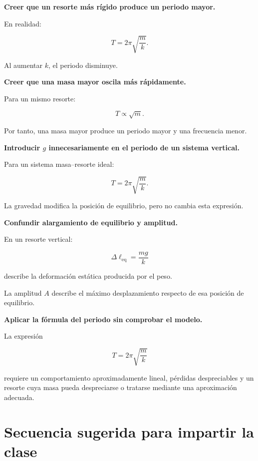 \begin{errorfrecuente}
\textbf{Creer que un resorte más rígido produce un periodo mayor.}

En realidad:

\[ T=2\pi\sqrt{\frac{m}{k}}. \]

Al aumentar \(k\), el periodo disminuye.
\end{errorfrecuente}

\begin{errorfrecuente}
\textbf{Creer que una masa mayor oscila más rápidamente.}

Para un mismo resorte:

\[ T\propto\sqrt{m}. \]

Por tanto, una masa mayor produce un periodo mayor y una frecuencia menor.
\end{errorfrecuente}

\begin{errorfrecuente}
\textbf{Introducir \(g\) innecesariamente en el periodo de un sistema vertical.}

Para un sistema masa--resorte ideal:

\[ T=2\pi\sqrt{\frac{m}{k}}. \]

La gravedad modifica la posición de equilibrio, pero no cambia esta expresión.
\end{errorfrecuente}

\begin{errorfrecuente}
\textbf{Confundir alargamiento de equilibrio y amplitud.}

En un resorte vertical:

\[ \Delta\ell_{\mathrm{eq}}=\frac{mg}{k} \]

describe la deformación estática producida por el peso.

La amplitud \(A\) describe el máximo desplazamiento respecto de esa posición de equilibrio.
\end{errorfrecuente}

\begin{errorfrecuente}
\textbf{Aplicar la fórmula del periodo sin comprobar el modelo.}

La expresión

\[ T=2\pi\sqrt{\frac{m}{k}} \]

requiere un comportamiento aproximadamente lineal, pérdidas despreciables y un resorte cuya masa pueda despreciarse o tratarse mediante una aproximación adecuada.
\end{errorfrecuente}


\section{Secuencia sugerida para impartir la clase}

